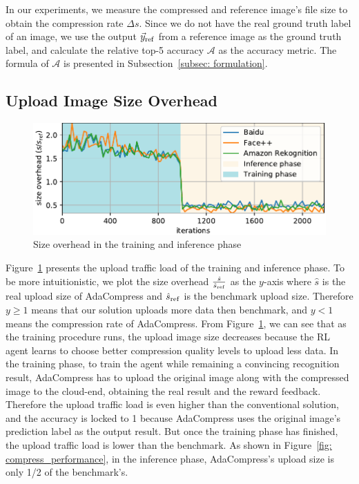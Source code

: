 In our experiments, we measure the compressed and reference image's file size to obtain the compression rate $ \Delta s $. Since we do not have the real ground truth label of an image, we use the output $ \vec{y}_{\rm ref} $ from a reference image as the ground truth label, and calculate the relative top-5 accuracy $ \mathcal{A} $ as the accuracy metric. The formula of $ \mathcal{A} $ is presented in Subsection~\ref{subsec: formulation}.

\subsection{Upload Image Size Overhead}

\begin{figure}[!t]
	\includegraphics[width=0.8\linewidth]{figures/train_steps_new.pdf}
	\caption{Size overhead in the training and inference phase}
	\label{fig: train_steps}
\end{figure}

Figure~\ref{fig: train_steps} presents the upload traffic load of the training and inference phase. To be more intuitionistic, we plot the size overhead {\color{revise2} $ \frac{\hat{s}}{\hat{s}_{\rm ref}} $} as the $ y $-axis where {\color{revise2} $ \hat{s} $} is the real upload size of AdaCompress and {\color{revise2} $ \hat{s}_{\rm ref} $} is the benchmark upload size. Therefore $ y \geq 1 $ means that our solution uploads more data then benchmark, and $ y < 1 $ means the compression rate of AdaCompress. From Figure~\ref{fig: train_steps}, we can see that as the training procedure runs, the upload image size decreases because the RL agent learns to choose better compression quality levels to upload less data. In the training phase, to train the agent while remaining a convincing recognition result, AdaCompress has to upload the original image along with the compressed image to the cloud-end, obtaining the real result and the reward feedback. \textcolor{revise3}{Therefore the upload traffic load is even higher than the conventional solution, and the accuracy is locked to 1 because AdaCompress uses the original image’s prediction label as the output result.} But once the training phase has finished, the upload traffic load is lower than the benchmark. As shown in Figure~\ref{fig: compress_performance}, in the inference phase, AdaCompress's upload size is only 1/2 of the benchmark's. %
